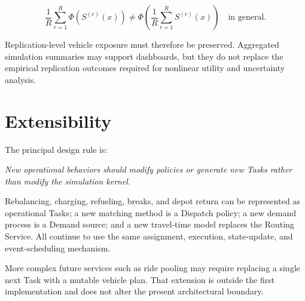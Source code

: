 \documentclass[11pt,a4paper]{article}
\begin{document}
\[
\frac{1}{R}\sum_{r=1}^{R}\Phi\!\left(S^{(r)}(x)\right)
\neq
\Phi\!\left(\frac{1}{R}\sum_{r=1}^{R}S^{(r)}(x)\right)
\quad\text{in general}.
\]

Replication-level vehicle exposure must therefore be preserved. Aggregated simulation summaries may support dashboards, but they do not replace the empirical replication outcomes required for nonlinear utility and uncertainty analysis.

\section{Extensibility}

The principal design rule is:

\begin{center}
\emph{New operational behaviors should modify policies or generate new Tasks rather than modify the simulation kernel.}
\end{center}

Rebalancing, charging, refueling, breaks, and depot return can be represented as operational Tasks; a new matching method is a Dispatch policy; a new demand process is a Demand source; and a new travel-time model replaces the Routing Service. All continue to use the same assignment, execution, state-update, and event-scheduling mechanism.

More complex future services such as ride pooling may require replacing a single next Task with a mutable vehicle plan. That extension is outside the first implementation and does not alter the present architectural boundary.
\end{document}
